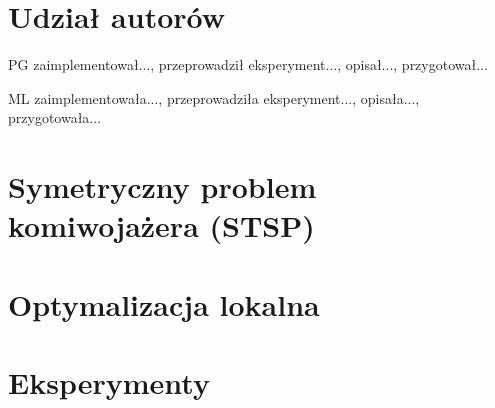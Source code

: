 \documentclass{article}
\begin{document}


\section*{Udział autorów}
\begin{tightlist}
\item PG zaimplementował..., przeprowadził eksperyment..., opisał..., przygotował...
\item ML zaimplementowała..., przeprowadziła eksperyment..., opisała..., przygotowała...
\end{tightlist}

\clearpage

\section{Symetryczny problem komiwojażera (STSP)}


\clearpage

\section{Optymalizacja lokalna}


\clearpage

\section{Eksperymenty}

\end{document}
